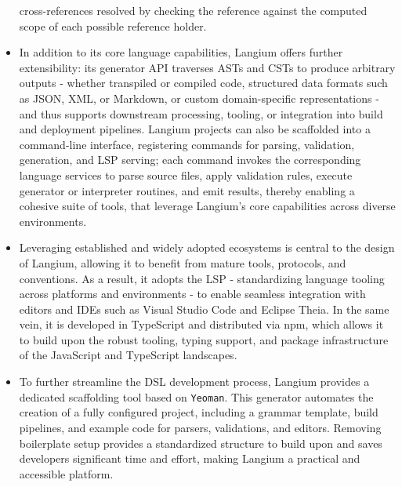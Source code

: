 \begin{multicols}{2}
\begin{itemize}
          cross-references resolved by checking the reference against the computed scope of each possible reference holder.
    \item In addition to its core language capabilities, Langium offers further extensibility: its generator API traverses ASTs and CSTs to produce arbitrary outputs
          - whether transpiled or compiled code, structured data formats such as JSON, XML, or Markdown, or custom domain-specific representations - and thus supports downstream
          processing, tooling, or integration into build and deployment pipelines.
          Langium projects can also be scaffolded into a command-line interface, registering commands for parsing, validation, generation, and LSP serving; each command invokes the
          corresponding language services to parse source files, apply validation rules, execute generator or interpreter routines, and emit results, thereby enabling a cohesive
          suite of tools, that leverage Langium's core capabilities across diverse environments.
    \item Leveraging established and widely adopted ecosystems is central to the design of Langium, allowing it to benefit from mature tools, protocols, and conventions.
          As a result, it adopts the LSP - standardizing language tooling across platforms and environments - to enable seamless integration with editors and IDEs such as Visual Studio Code and Eclipse Theia.
          In the same vein, it is developed in TypeScript and distributed via npm, which allows it to build upon the robust tooling, typing support, and package infrastructure of the JavaScript and TypeScript landscapes.
    \item To further streamline the DSL development process, Langium provides a dedicated scaffolding tool based on \verb|Yeoman|. This generator automates the creation of a
          fully configured project, including a grammar template, build pipelines, and example code for parsers, validations, and editors. Removing boilerplate setup provides a
          standardized structure to build upon and saves developers significant time and effort, making Langium a practical and accessible platform.
  \end{itemize}
\end{multicols}

